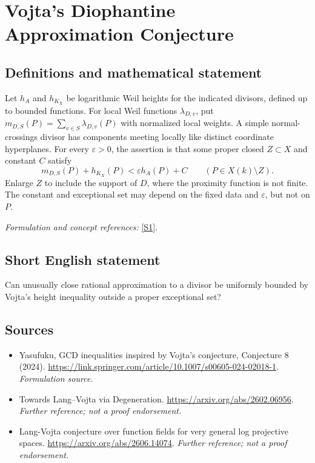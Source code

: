 \documentclass[11pt]{article}
\begin{document}
\section*{\texorpdfstring{Vojta's Diophantine Approximation Conjecture}{Vojta's Diophantine Approximation Conjecture}}\label{statement}
\subsection{Definitions and mathematical statement}
Let $h_A$ and $h_{K_X}$ be logarithmic Weil heights for the indicated divisors, defined up to bounded functions. For local Weil functions $\lambda_{D,v}$, put $m_{D,S}(P)=\sum_{v\in S}\lambda_{D,v}(P)$ with normalized local weights. A simple normal-crossings divisor has components meeting locally like distinct coordinate hyperplanes. For every $\varepsilon>0$, the assertion is that some proper closed $Z\subset X$ and constant $C$ satisfy
\[
 m_{D,S}(P)+h_{K_X}(P)<\varepsilon h_A(P)+C
 \qquad(P\in X(k)\setminus Z).
\]
Enlarge $Z$ to include the support of $D$, where the proximity function is not finite. The constant and exceptional set may depend on the fixed data and $\varepsilon$, but not on $P$.
\par\smallskip\textit{Formulation and concept references:} \href{https://link.springer.com/article/10.1007/s00605-024-02018-1}{[S1]}.

\subsection{Short English statement}
Can unusually close rational approximation to a divisor be uniformly bounded by Vojta's height inequality outside a proper exceptional set?
\subsection{Sources}
\begin{itemize}
\item[S1]Yasufuku, GCD inequalities inspired by Vojta's conjecture, Conjecture 8 (2024).
\url{https://link.springer.com/article/10.1007/s00605-024-02018-1}.
\textit{Formulation source.}
\item[S2]Towards Lang--Vojta via Degeneration.
\url{https://arxiv.org/abs/2602.06956}.
\textit{Further reference; not a proof endorsement.}
\item[S3]Lang-Vojta conjecture over function fields for very general log projective spaces.
\url{https://arxiv.org/abs/2606.14074}.
\textit{Further reference; not a proof endorsement.}
\end{itemize}
\end{document}
